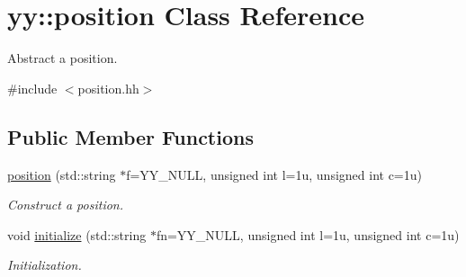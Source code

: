 \hypertarget{classyy_1_1position}{\section{yy\-:\-:position Class Reference}
\label{classyy_1_1position}
}


Abstract a position.  




{\ttfamily \#include $<$position.\-hh$>$}

\subsection*{Public Member Functions}
\begin{DoxyCompactItemize}
\item 
\hypertarget{classyy_1_1position_a636b0788d4eb92d6cf8fb7d0094feb2b}{\hyperlink{classyy_1_1position_a636b0788d4eb92d6cf8fb7d0094feb2b}{position} (std\-::string $\ast$f=Y\-Y\-\_\-\-N\-U\-L\-L, unsigned int l=1u, unsigned int c=1u)}\label{classyy_1_1position_a636b0788d4eb92d6cf8fb7d0094feb2b}

\begin{DoxyCompactList}\small\item\em Construct a position. \end{DoxyCompactList}\item 
\hypertarget{classyy_1_1position_add807c5b2364f8842ebd565cd1691d5b}{void \hyperlink{classyy_1_1position_add807c5b2364f8842ebd565cd1691d5b}{initialize} (std\-::string $\ast$fn=Y\-Y\-\_\-\-N\-U\-L\-L, unsigned int l=1u, unsigned int c=1u)}\label{classyy_1_1position_add807c5b2364f8842ebd565cd1691d5b}

\begin{DoxyCompactList}\small\item\em Initialization. \end{DoxyCompactList}\end{DoxyCompactItemize}
